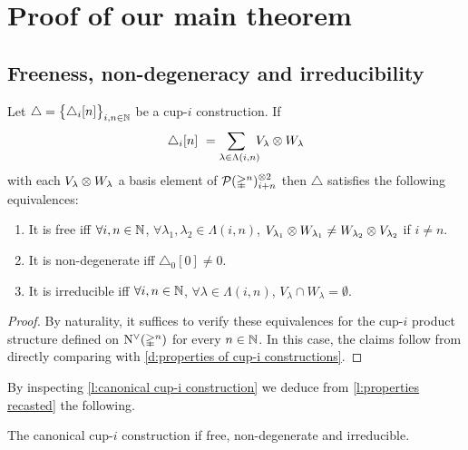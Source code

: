 
\section{Proof of our main theorem} \label{s:proof}

\subsection{Freeness, non-degeneracy and irreducibility} \label{ss:free non-deg irreducible}

\begin{lemma} \label{l:properties recasted}
	Let $\triangle = \big\{ \triangle_i [n] \big\}_{i,n\in\mathbb{N}}$ be a \mbox{cup-$i$} construction.
	If
	\[
	\triangle_i [n] \ =
	\sum_{\lambda \in \Lambda(i,n) \kern-5pt} V_\lambda \otimes W_\lambda
	\]
	with each $V_\lambda \otimes W_\lambda$ a basis element of $\mathcal{P}(\mathbb{\Delta}^n)^{\otimes 2}_{i+n}$ then $\triangle$ satisfies the following equivalences:
	\begin{enumerate}
		\item It is free iff \kern 1pt
		$\forall i,n \in \mathbb{N}$, $\forall \lambda_1, \lambda_2 \in \Lambda(i,n)$, $V_{\lambda_1} \otimes W_{\lambda_1} \neq W_{\lambda_2} \otimes V_{\lambda_2}$ if $i \neq n$.
		\item It is non-degenerate iff
		$\triangle_0 [0] \neq 0$.
		\item It is irreducible iff \kern 1pt
		$\forall i,n \in \mathbb{N}$, $\forall \lambda \in \Lambda(i,n)$, $V_\lambda \cap W_\lambda = \emptyset$.
	\end{enumerate}
\end{lemma}

\begin{proof}
	By naturality, it suffices to verify these equivalences for the \mbox{cup-$i$} product structure defined on $\operatorname{N^{\vee}}(\mathbb{\Delta}^n)$ for every $n \in \mathbb{N}$.
	In this case, the claims follow from directly comparing with \cref{d:properties of cup-i constructions}.
\end{proof}

By inspecting \cref{l:canonical cup-i construction} we deduce from \cref{l:properties recasted} the following.

\begin{theorem} \label{t:existence}
	The canonical \mbox{cup-$i$} construction if free, non-degenerate and irreducible.
\end{theorem}


